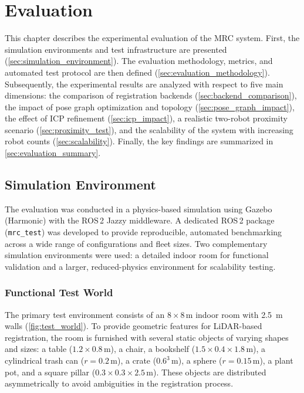 \chapter{Evaluation}
\label{ch:evaluation}

This chapter describes the experimental evaluation of the MRC system.
First, the simulation environments and test infrastructure are presented
(\autoref{sec:simulation_environment}).
The evaluation methodology, metrics, and automated test protocol are
then defined (\autoref{sec:evaluation_methodology}).
Subsequently, the experimental results are analyzed with respect to
five main dimensions: the comparison of registration backends
(\autoref{sec:backend_comparison}), the impact of pose graph optimization
and topology (\autoref{sec:pose_graph_impact}), the effect of ICP
refinement (\autoref{sec:icp_impact}), a realistic two-robot proximity
scenario (\autoref{sec:proximity_test}), and the scalability of the
system with increasing robot counts
(\autoref{sec:scalability}).
Finally, the key findings are summarized in
\autoref{sec:evaluation_summary}.

\section{Simulation Environment}
\label{sec:simulation_environment}

The evaluation was conducted in a physics-based simulation using Gazebo
(Harmonic) with the ROS\,2 Jazzy middleware.
A dedicated ROS\,2 package (\texttt{mrc\_test}) was developed to
provide reproducible, automated benchmarking across a wide range of
configurations and fleet sizes.
Two complementary simulation environments were used: a detailed
indoor room for functional validation and a larger, reduced-physics
environment for scalability testing.

\subsection{Functional Test World}
\label{sec:test_world}

The primary test environment consists of an $8 \times 8$\,m indoor
room with \SI{2.5}{\metre} walls (\autoref{fig:test_world}).
To provide geometric features for LiDAR-based registration, the
room is furnished with several static objects of varying shapes
and sizes: a table ($1.2 \times 0.8$\,m), a chair, a bookshelf
($1.5 \times 0.4 \times 1.8$\,m), a cylindrical trash can
($r = 0.2$\,m), a crate ($0.6^3$\,m), a sphere ($r = 0.15$\,m),
a plant pot, and a square pillar ($0.3 \times 0.3 \times 2.5$\,m).
These objects are distributed asymmetrically to avoid ambiguities
in the registration process.

